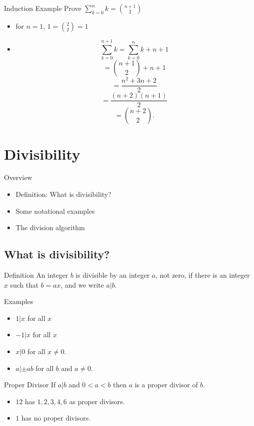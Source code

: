 \documentclass{beamer}
\begin{document}
\begin{frame}{Induction Example}
  Prove $\sum_{k=0}^n k = {n+1 \choose 2}$
  \begin{itemize}
  \item for $n = 1$, $1 = {2 \choose 2} = 1$
  \item $$\sum_{k=0}^{n+1} k = \sum_{k=0}^n k + n+1$$
    $$= {n+1 \choose 2} + n+1$$
    $$=\frac{n^2 + 3n + 2}{2}$$
    $$=\frac{(n+2)(n+1)}{2}$$
    $$={n+2 \choose 2}.$$
  \end{itemize}
\end{frame}
    

\section{Divisibility}

\begin{frame}{Overview}
  \begin{itemize}
  \item Definition: What is divisibility?
  \item Some notational examples
  \item The division algorithm
  \end{itemize}
\end{frame}

\subsection{What is divisibility?}

\begin{frame}{Definition}
An integer $b$ is divisible by an integer $a$, not zero, if there is
an integer $x$ such that $b = ax$, and we write $a | b$. 
\end{frame}

\begin{frame}{Examples}
  \begin{itemize}
  \item $1 | x$ for all $x$
  \item $-1 | x$ for all $x$
  \item $x | 0$ for all $x \ne 0$.
  \item $a | \pm ab$ for all $b$ and $a \ne 0$.
  \end{itemize}
\end{frame}

\begin{frame}{Proper Divisor}
  If $a|b$ and $0 < a < b$ then $a$ is a proper divisor of $b$.
  \begin{itemize}
  \item $12$ has $1, 2, 3, 4, 6$ as proper divisors.
  \item $1$ has no proper divisors.
  \end{itemize}
\end{frame}
\end{document}
